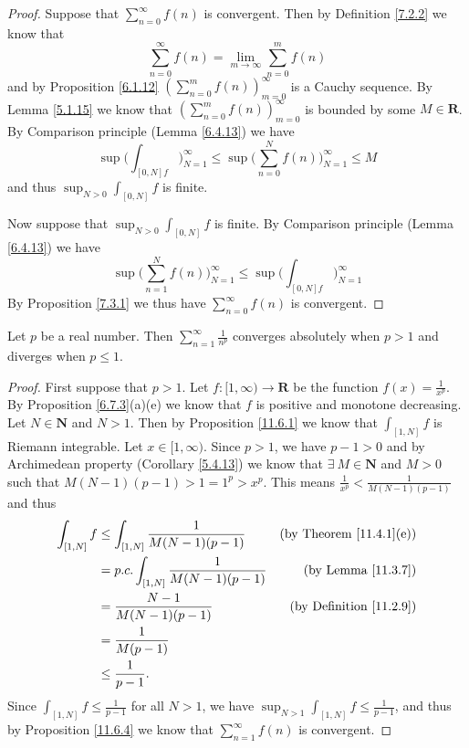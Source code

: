\begin{proof}
    Suppose that \(\sum_{n = 0}^\infty f(n)\) is convergent.
    Then by Definition \ref{7.2.2} we know that
    \[
        \sum_{n = 0}^\infty f(n) = \lim_{m \to \infty} \sum_{n = 0}^m f(n)
    \]
    and by Proposition \ref{6.1.12} \((\sum_{n = 0}^m f(n))_{m = 0}^\infty\) is a Cauchy sequence.
    By Lemma \ref{5.1.15} we know that \((\sum_{n = 0}^m f(n))_{m = 0}^\infty\) is bounded by some \(M \in \mathbf{R}\).
    By Comparison principle (Lemma \ref{6.4.13}) we have
    \[
        \sup \bigg(\int_{[0, N] f}\bigg)_{N = 1}^\infty \leq \sup \bigg(\sum_{n = 0}^N f(n)\bigg)_{N = 1}^\infty \leq M
    \]
    and thus \(\sup_{N > 0} \int_{[0, N]} f\) is finite.

    Now suppose that \(\sup_{N > 0} \int_{[0, N]} f\) is finite.
    By Comparison principle (Lemma \ref{6.4.13}) we have
    \[
        \sup \bigg(\sum_{n = 1}^N f(n)\bigg)_{N = 1}^\infty \leq \sup \bigg(\int_{[0, N] f}\bigg)_{N = 1}^\infty
    \]
    By Proposition \ref{7.3.1} we thus have \(\sum_{n = 0}^\infty f(n)\) is convergent.
\end{proof}

\begin{corollary}\label{11.6.5}
    Let \(p\) be a real number.
    Then \(\sum_{n = 1}^\infty \frac{1}{n^p}\) converges absolutely when \(p > 1\) and diverges when \(p \leq 1\).
\end{corollary}

\begin{proof}
    First suppose that \(p > 1\).
    Let \(f : [1, \infty) \to \mathbf{R}\) be the function \(f(x) = \frac{1}{x^p}\).
    By Proposition \ref{6.7.3}(a)(e) we know that \(f\) is positive and monotone decreasing.
    Let \(N \in \mathbf{N}\) and \(N > 1\).
    Then by Proposition \ref{11.6.1} we know that \(\int_{[1, N]} f\) is Riemann integrable.
    Let \(x \in [1, \infty)\).
    Since \(p > 1\), we have \(p - 1 > 0\) and by Archimedean property (Corollary \ref{5.4.13}) we know that \(\exists\ M \in \mathbf{N}\) and \(M > 0\) such that \(M(N - 1)(p - 1) > 1 = 1^p > x^p\).
    This means \(\frac{1}{x^p} < \frac{1}{M(N - 1)(p - 1)}\) and thus
    \begin{align*}
        \int_{[1, N]} f & \leq \int_{[1, N]} \frac{1}{M(N - 1)(p - 1)}   & \text{(by Theorem \ref{11.4.1}(e))} \\
                        & = p.c. \int_{[1, N]} \frac{1}{M(N - 1)(p - 1)} & \text{(by Lemma \ref{11.3.7})}      \\
                        & = \frac{N - 1}{M(N - 1)(p - 1)}                & \text{(by Definition \ref{11.2.9})} \\
                        & = \frac{1}{M(p - 1)}                                                                 \\
                        & \leq \frac{1}{p - 1}.
    \end{align*}
    Since \(\int_{[1, N]} f \leq \frac{1}{p - 1}\) for all \(N > 1\), we have \(\sup_{N > 1} \int_{[1, N]} f \leq \frac{1}{p - 1}\), and thus by Proposition \ref{11.6.4} we know that \(\sum_{n = 1}^\infty f(n)\) is convergent.
\end{proof}

